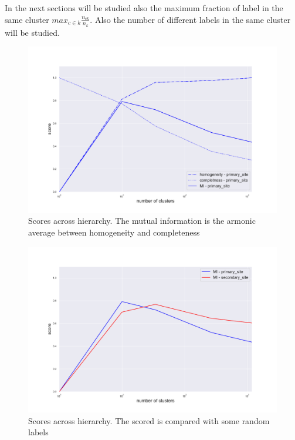 In the next sections will be studied also the maximum fraction of label in the same cluster \(max_{c\in k}\frac{n_{c k}}{n_k}\).
Also the number of different labels in the same cluster will be studied.

\begin{figure}[htb!]
    \centering
    \includegraphics[width=0.9\linewidth]{pictures/topic/gtex/oversigma_10tissue/metric_scores_primarysite.pdf}
    \caption{Scores across hierarchy. The mutual information is the armonic average between homogeneity and completeness}
    \label{fig:topic/gtex/oversigma_10tissue/metric_scores_primarysite}
\end{figure}

\begin{figure}[htb!]
    \centering
    \includegraphics[width=0.9\linewidth]{pictures/topic/gtex/oversigma_10tissue/metric_scores.pdf}
    \caption{Scores across hierarchy. The scored is compared with some random labels}
    \label{fig:topic/gtex/oversigma_10tissue/metric_scores}
\end{figure}